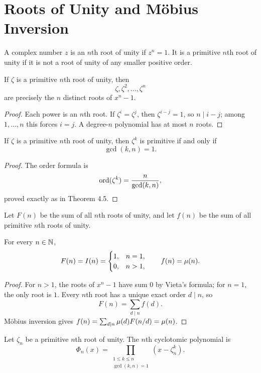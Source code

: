 \chapter{Roots of Unity and M\"obius Inversion}

\begin{de}
A complex number $z$ is an $n$th root of unity if $z^n=1$.  It is a primitive $n$th root of unity if it is not a root of unity of any smaller positive order.
\end{de}

\begin{thm}
If $\zeta$ is a primitive $n$th root of unity, then
\[
 \zeta,\zeta^2,\ldots,\zeta^n
\]
are precisely the $n$ distinct roots of $x^n-1$.
\end{thm}
\begin{proof}
Each power is an $n$th root.  If $\zeta^i=\zeta^j$, then
$\zeta^{i-j}=1$, so $n\mid i-j$; among $1,\ldots,n$ this forces $i=j$.  A degree-$n$ polynomial has at most $n$ roots.
\end{proof}

\begin{thm}
If $\zeta$ is a primitive $n$th root of unity, then $\zeta^k$ is primitive if and only if
\[
 \gcd(k,n)=1.
\]
\end{thm}
\begin{proof}
The order formula is
\[
 \operatorname{ord}(\zeta^k)=\frac n{\gcd(k,n)},
\]
proved exactly as in Theorem 4.5.
\end{proof}

\begin{de}
Let $F(n)$ be the sum of all $n$th roots of unity, and let $f(n)$ be the sum of all primitive $n$th roots of unity.
\end{de}

\begin{thm}
For every $n\in\mathbb{N}$,
\[
 F(n)=I(n)=
 \begin{cases}
 1,&n=1,\\
 0,&n>1,
 \end{cases}
 \qquad
 f(n)=\mu(n).
\]
\end{thm}
\begin{proof}
For $n>1$, the roots of $x^n-1$ have sum $0$ by Vieta's formula; for $n=1$, the only root is $1$.  Every $n$th root has a unique exact order $d\mid n$, so
\[
 F(n)=\sum_{d\mid n}f(d).
\]
M\"obius inversion gives
$f(n)=\sum_{d\mid n}\mu(d)F(n/d)=\mu(n)$.
\end{proof}

\begin{de}
Let $\zeta_n$ be a primitive $n$th root of unity.  The $n$th cyclotomic polynomial is
\[
 \Phi_n(x)=\prod_{\substack{1\le k\le n\\\gcd(k,n)=1}}
 (x-\zeta_n^k).
\]
\end{de}

